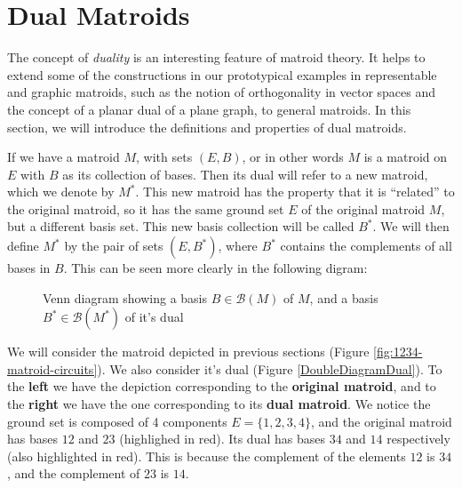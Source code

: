 \newpage
\section{Dual Matroids}
The concept of \textit{duality} is an interesting feature of matroid theory. It helps to extend some of the constructions in our prototypical examples in representable and graphic matroids, such as the notion of orthogonality in vector spaces and the concept of a planar dual of a plane graph, to general matroids. In this section, we will introduce the definitions and  properties of dual matroids.



If we have a matroid $M$, with sets $(E,B)$, or in other words $M$ is a matroid on $E$ with $B$ as its collection of bases. Then its dual will refer to a new matroid, which we denote by $M^*$. This new matroid has the property that it is ``related'' to the original matroid, so it has the same ground set $E$ of the original matroid $M$, but a different basis set. This new basis collection will be called $B^*$. We will then define $M^*$ by the pair of sets $(E,B^*)$, where $B^*$ contains the complements of all bases in $B$. This can be seen more clearly in the following digram:
\begin{figure}[H]
    \centering
{}
    \caption{Venn diagram showing a basis $B \in \mathcal B(M)$ of $M$, and a basis $B^* \in \mathcal B(M^*)$ of it's dual}%
\label{graphic}%
\end{figure}

We will consider the matroid depicted in previous sections (Figure \ref{fig:1234-matroid-circuits}). We also consider it's dual (Figure \ref{DoubleDiagramDual}). To the \textbf{left} we have the depiction corresponding to the \textbf{original matroid}, and to the \textbf{right} we have the one corresponding to its \textbf{dual matroid}. 
We notice the ground set is composed of 4 components $E=\{1,2,3,4\}$, and the original matroid has bases $12$ and $23$ (highlighed in red). Its dual has bases $34$ and $14$ respectively (also highlighted in red). This is because the complement of the elements $12$ is $34$, and the complement of $23$ is $14$.

